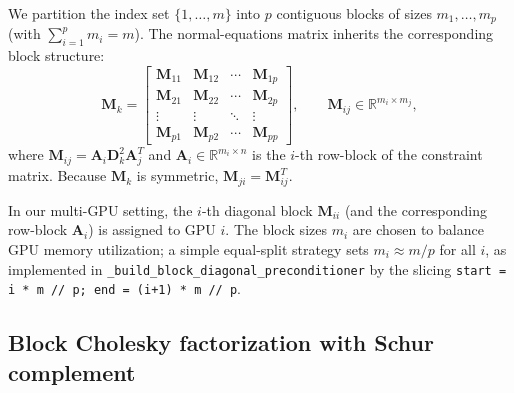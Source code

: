 \documentclass[11pt,twoside]{article}
\newcommand{\R}{\mathbb{R}}
\newcommand{\bA}{\mathbf{A}}
\newcommand{\bD}{\mathbf{D}}
\newcommand{\bM}{\mathbf{M}}
\begin{document}
We partition the index set $\{1,\dots,m\}$ into $p$ contiguous blocks of
sizes $m_1,\dots,m_p$ (with $\sum_{i=1}^p m_i = m$).  The normal-equations
matrix inherits the corresponding block structure:
\begin{equation}
  \bM_k =
  \begin{bmatrix}
    \bM_{11} & \bM_{12} & \cdots & \bM_{1p} \\[4pt]
    \bM_{21} & \bM_{22} & \cdots & \bM_{2p} \\[4pt]
    \vdots   & \vdots   & \ddots & \vdots   \\[4pt]
    \bM_{p1} & \bM_{p2} & \cdots & \bM_{pp}
  \end{bmatrix},
  \qquad
  \bM_{ij} \in \R^{m_i \times m_j},
  \label{eq:block-partition}
\end{equation}
where $\bM_{ij} = \bA_i\bD_k^2\bA_j^T$ and $\bA_i \in \R^{m_i \times n}$ is
the $i$-th row-block of the constraint matrix.  Because $\bM_k$ is symmetric,
$\bM_{ji} = \bM_{ij}^T$.

In our multi-GPU setting, the $i$-th diagonal block $\bM_{ii}$ (and the
corresponding row-block $\bA_i$) is assigned to GPU $i$.  The block sizes
$m_i$ are chosen to balance GPU memory utilization; a simple equal-split
strategy sets $m_i \approx m/p$ for all $i$, as implemented in
\texttt{\_build\_block\_diagonal\_preconditioner} by the slicing
\texttt{start = i * m // p; end = (i+1) * m // p}.

\subsection{Block Cholesky factorization with Schur complement}
\end{document}
